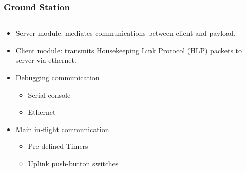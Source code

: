 \documentclass[landscape,xcolor={table},10pt]{beamer}
\begin{document}
	\begin{frame}
		
		\frametitle{Ground Station}
		
		\begin{columns}[T] %
		\begin{column}{.53\textwidth}

			 \begin{itemize}
				  	\item{Server module: mediates communications between client and payload.}
				  	\item{Client module: transmits Housekeeping Link Protocol (HLP) packets to server via ethernet.}				  	
				  	\item{Debugging communication}
				  	\begin{itemize}
				  		\item{Serial console}
				  		\item{Ethernet}
				  	\end{itemize}
				  	\item{Main in-flight communication}
					\begin{itemize}
				  		\item{Pre-defined Timers}
				  		\item{Uplink push-button switches}
				  	\end{itemize}
				  	
			 \end{itemize}
			
		\end{column}%
		\hfill%
		\begin{column}{.45\textwidth}


\end{column}
\end{columns}
\end{frame}
\end{document}
